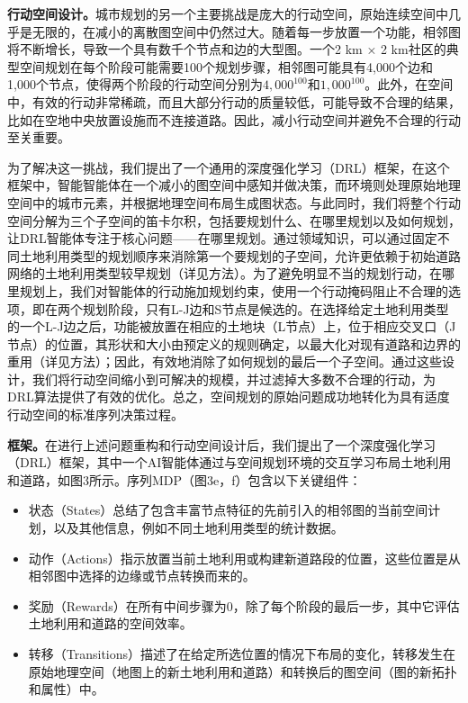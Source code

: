 \textbf{行动空间设计。}城市规划的另一个主要挑战是庞大的行动空间，原始连续空间中几乎是无限的，在减小的离散图空间中仍然过大。随着每一步放置一个功能，相邻图将不断增长，导致一个具有数千个节点和边的大型图。一个2 km × 2 km社区的典型空间规划在每个阶段可能需要100个规划步骤，相邻图可能具有4,000个边和1,000个节点，使得两个阶段的行动空间分别为$4,000^{100}$和$1,000^{100}$。此外，在空间中，有效的行动非常稀疏，而且大部分行动的质量较低，可能导致不合理的结果，比如在空地中央放置设施而不连接道路。因此，减小行动空间并避免不合理的行动至关重要。

为了解决这一挑战，我们提出了一个通用的深度强化学习（DRL）框架，在这个框架中，智能智能体在一个减小的图空间中感知并做决策，而环境则处理原始地理空间中的城市元素，并根据地理空间布局生成图状态。与此同时，我们将整个行动空间分解为三个子空间的笛卡尔积，包括要规划什么、在哪里规划以及如何规划，让DRL智能体专注于核心问题——在哪里规划。通过领域知识，可以通过固定不同土地利用类型的规划顺序来消除第一个要规划的子空间，允许更依赖于初始道路网络的土地利用类型较早规划（详见方法）。为了避免明显不当的规划行动，在哪里规划上，我们对智能体的行动施加规划约束，使用一个行动掩码阻止不合理的选项，即在两个规划阶段，只有L-J边和S节点是候选的。在选择给定土地利用类型的一个L-J边之后，功能被放置在相应的土地块（L节点）上，位于相应交叉口（J节点）的位置，其形状和大小由预定义的规则确定，以最大化对现有道路和边界的重用（详见方法）；因此，有效地消除了如何规划的最后一个子空间。通过这些设计，我们将行动空间缩小到可解决的规模，并过滤掉大多数不合理的行动，为DRL算法提供了有效的优化。总之，空间规划的原始问题成功地转化为具有适度行动空间的标准序列决策过程。

\textbf{框架。}在进行上述问题重构和行动空间设计后，我们提出了一个深度强化学习（DRL）框架，其中一个AI智能体通过与空间规划环境的交互学习布局土地利用和道路，如图3所示。序列MDP（图3e，f）包含以下关键组件：

\begin{itemize}
    \item 状态（States）总结了包含丰富节点特征的先前引入的相邻图的当前空间计划，以及其他信息，例如不同土地利用类型的统计数据。
    \item 动作（Actions）指示放置当前土地利用或构建新道路段的位置，这些位置是从相邻图中选择的边缘或节点转换而来的。
    \item 奖励（Rewards）在所有中间步骤为0，除了每个阶段的最后一步，其中它评估土地利用和道路的空间效率。
    \item 转移（Transitions）描述了在给定所选位置的情况下布局的变化，转移发生在原始地理空间（地图上的新土地利用和道路）和转换后的图空间（图的新拓扑和属性）中。
\end{itemize}

